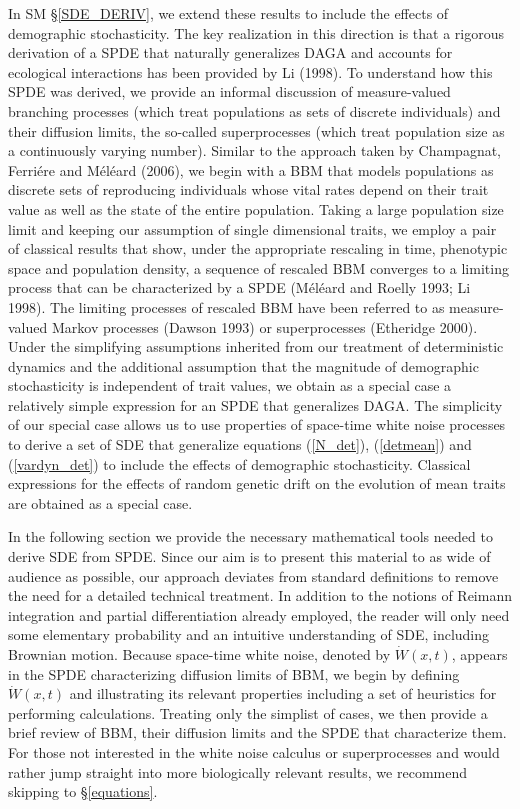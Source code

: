 \documentclass[]{article}
\begin{document}
In SM \S\ref{SDE_DERIV}, we extend these results to include the effects
of demographic stochasticity. The key realization in this direction is
that a rigorous derivation of a SPDE that naturally generalizes DAGA and
accounts for ecological interactions has been provided by Li (1998). To
understand how this SPDE was derived, we provide an informal discussion
of measure-valued branching processes (which treat populations as sets
of discrete individuals) and their diffusion limits, the so-called
superprocesses (which treat population size as a continuously varying
number). Similar to the approach taken by Champagnat, Ferriére and
Méléard (2006), we begin with a BBM that models populations as discrete
sets of reproducing individuals whose vital rates depend on their trait
value as well as the state of the entire population. Taking a large
population size limit and keeping our assumption of single dimensional
traits, we employ a pair of classical results that show, under the
appropriate rescaling in time, phenotypic space and population density,
a sequence of rescaled BBM converges to a limiting process that can be
characterized by a SPDE (Méléard and Roelly 1993; Li 1998). The limiting
processes of rescaled BBM have been referred to as measure-valued Markov
processes (Dawson 1993) or superprocesses (Etheridge 2000). Under the
simplifying assumptions inherited from our treatment of deterministic
dynamics and the additional assumption that the magnitude of demographic
stochasticity is independent of trait values, we obtain as a special
case a relatively simple expression for an SPDE that generalizes DAGA.
The simplicity of our special case allows us to use properties of
space-time white noise processes to derive a set of SDE that generalize
equations (\ref{N_det}), (\ref{detmean}) and (\ref{vardyn_det}) to
include the effects of demographic stochasticity. Classical expressions
for the effects of random genetic drift on the evolution of mean traits
are obtained as a special case.

In the following section we provide the necessary mathematical tools
needed to derive SDE from SPDE. Since our aim is to present this
material to as wide of audience as possible, our approach deviates from
standard definitions to remove the need for a detailed technical
treatment. In addition to the notions of Reimann integration and partial
differentiation already employed, the reader will only need some
elementary probability and an intuitive understanding of SDE, including
Brownian motion. Because space-time white noise, denoted by
\(\dot W(x,t)\), appears in the SPDE characterizing diffusion limits of
BBM, we begin by defining \(\dot W(x,t)\) and illustrating its relevant
properties including a set of heuristics for performing calculations.
Treating only the simplist of cases, we then provide a brief review of
BBM, their diffusion limits and the SPDE that characterize them. For
those not interested in the white noise calculus or superprocesses and
would rather jump straight into more biologically relevant results, we
recommend skipping to \S\ref{equations}.
\end{document}
